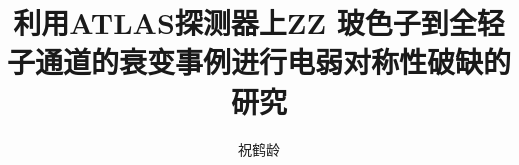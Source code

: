 \documentclass[doctor,english,pdf]{ustcthesis}
\title{利用ATLAS探测器上ZZ 玻色子到全轻子通道的衰变事例进行电弱对称性破缺的研究}
\author{祝鹤龄}
\begin{document}

\maketitle
\makestatement

\frontmatter


\tableofcontents

\mainmatter




%


\appendix
%

\backmatter
%
\end{document}
